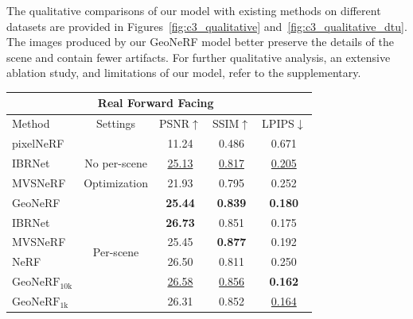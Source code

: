 The qualitative comparisons of our model with existing methods on different datasets are provided in Figures~\ref{fig:c3_qualitative} and~\ref{fig:c3_qualitative_dtu}. The images produced by our GeoNeRF model better preserve the details of the scene and contain fewer artifacts. For further qualitative analysis, an extensive ablation study, and limitations of our model, refer to the supplementary.

\FloatBarrier

\begin{table}[!t]
    \begin{center}
        \begin{threeparttable}
            \begin{tabular}{l|c|ccc}
            \hline
            \multicolumn{5}{c}{Real Forward Facing~\cite{mildenhall2019llff}} \\
            \hline
            Method & Settings & PSNR$\uparrow$ & SSIM$\uparrow$ & LPIPS$\downarrow$ \\
            \hline
            pixelNeRF~\cite{yu2021pixelnerf} &  & 11.24 & 0.486 & 0.671 \\
            IBRNet~\cite{wang2021ibrnet} & No per-scene & \underline{25.13} & \underline{0.817} & \underline{0.205} \\
            MVSNeRF~\cite{chen2021mvsnerf} & Optimization & 21.93 & 0.795 & 0.252 \\
            GeoNeRF &  & \textbf{25.44} & \textbf{0.839} & \textbf{0.180} \\
            \hline
            IBRNet~\cite{wang2021ibrnet} &  & \textbf{26.73} & 0.851 & 0.175 \\
            MVSNeRF~\cite{chen2021mvsnerf} & \multirow{2}{*}{Per-scene} & 25.45 & \textbf{0.877} & 0.192 \\
            NeRF~\cite{mildenhall2020nerf} & \multirow{2}{*}{Optimization} & 26.50 & 0.811 & 0.250 \\
            $\text{GeoNeRF}_{\text{10k}}$ &  & \underline{26.58} & \underline{0.856} & \textbf{0.162} \\
            $\text{GeoNeRF}_{\text{1k}}$ &  & 26.31 & 0.852 & \underline{0.164} \\
            \hline
            \end{tabular}
        \end{threeparttable}
    \end{center}

\end{table}
